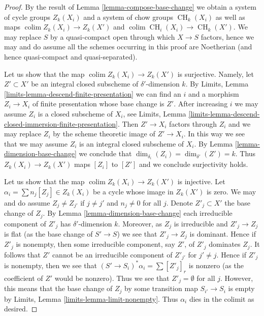 \documentclass[10pt,a4paper]{amsart}
\theoremstyle{plain}
\theoremstyle{definition}
\theoremstyle{remark}
\numberwithin{equation}{subsection}
\def\colim{\mathop{\mathrm{colim}}\nolimits}
\def\CH{\mathop{\mathrm{CH}}\nolimits}
\begin{document}
\begin{proof}
By the result of Lemma \ref{lemma-compose-base-change} we obtain
a system of cycle groups $Z_k(X_i)$ and a system of
chow groups $\CH_k(X_i)$ as well as maps
$\colim Z_k(X_i) \to Z_k(X')$ and $\colim \CH_i(X_i) \to \CH_k(X')$.
We may replace $S$ by a quasi-compact open through which $X \to S$
factors, hence we may and do assume all the schemes occurring in
this proof are Noetherian (and hence quasi-compact and quasi-separated).

\medskip\noindent
Let us show that the map $\colim Z_k(X_i) \to Z_k(X')$ is surjective.
Namely, let $Z' \subset X'$
be an integral closed subscheme of $\delta'$-dimension $k$. By
Limits, Lemma \ref{limits-lemma-descend-finite-presentation}
we can find an $i$ and a morphism $Z_i \to X_i$ of finite presentation
whose base change is $Z'$. After increasing $i$ we may assume $Z_i$
is a closed subscheme of $X_i$, see
Limits, Lemma \ref{limits-lemma-descend-closed-immersion-finite-presentation}.
Then $Z' \to X_i$ factors through $Z_i$ and we may replace $Z_i$
by the scheme theoretic image of $Z' \to X_i$. In this way we see
that we may assume $Z_i$ is an integral closed subscheme of $X_i$.
By Lemma \ref{lemma-dimension-base-change} we conclude that
$\dim_{\delta_i}(Z_i) = \dim_{\delta'}(Z') = k$.
Thus $Z_k(X_i) \to Z_k(X')$ maps $[Z_i]$ to $[Z']$ and
we conclude surjectivity holds.

\medskip\noindent
Let us show that the map $\colim Z_k(X_i) \to Z_k(X')$ is injective.
Let $\alpha_i = \sum n_j[Z_j] \in Z_k(X_i)$ be a cycle whose image
in $Z_k(X')$ is zero. We may and do assume $Z_j \not = Z_{j'}$ if
$j \not = j'$ and $n_j \not = 0$ for all $j$.
Denote $Z'_j \subset X'$ the base change of $Z_j$.
By Lemma \ref{lemma-dimension-base-change} each irreducible component
of $Z'_j$ has $\delta'$-dimension $k$. Moreover, as $Z_j$ is irreducible
and $Z'_j \to Z_j$ is flat (as the base change of $S' \to S$)
we see that $Z'_j \to Z_j$ is dominant.
Hence if $Z'_j$ is nonempty, then some irreducible component, say
$Z'$, of $Z'_j$ dominates $Z_j$. It follows that $Z'$
cannot be an irreducible component of $Z'_{j'}$ for $j' \not = j$.
Hence if $Z'_j$ is nonempty, then we see that $(S' \to S_i)^*\alpha_i
= \sum [Z'_j]_r$ is nonzero (as the coefficient of $Z'$ would be nonzero).
Thus we see that $Z'_j = \emptyset$ for all $j$. However, this means
that the base change of $Z_j$ by some transition map $S_{i'} \to S_i$
is empty by Limits, Lemma \ref{limits-lemma-limit-nonempty}.
Thus $\alpha_i$ dies in the colimit as desired.


\end{proof}
\end{document}
